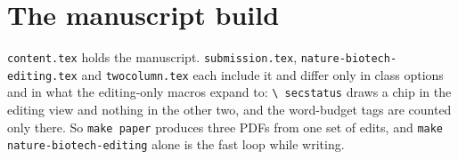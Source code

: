 
\section{The manuscript build}
\label{sec:manuscript}


\texttt{content.tex} holds the manuscript. \texttt{submission.tex},
\texttt{nature-biotech-editing.tex} and \texttt{twocolumn.tex} each include it and differ only in
class options and in what the editing-only macros expand to: \texttt{\textbackslash
secstatus} draws a chip in the editing view and nothing in the other two, and the
word-budget tags are counted only there. So \texttt{make paper} produces three PDFs
from one set of edits, and \texttt{make nature-biotech-editing} alone is the fast loop while
writing.

